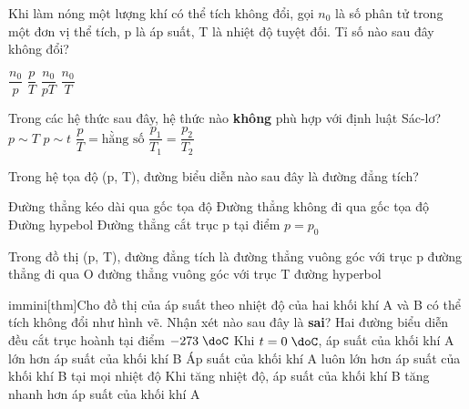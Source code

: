 \begin{ex} %
	Khi làm nóng một lượng khí có thể tích không đổi, gọi $n_0$ là số phân tử trong một đơn vị thể tích, p là áp suất, T là nhiệt độ tuyệt đối. Tỉ số nào sau đây không đổi?
	
	\choice
	{$\dfrac{n_0}{p}$}
	{\True $\dfrac{p}{T}$}
	{$\dfrac{n_0}{pT}$}
	{$\dfrac{n_0}{T}$}
	
\end{ex}
\begin{ex}%
	Trong các hệ thức sau đây, hệ thức nào \textbf{không} phù hợp với định luật Sác-lơ?
	\choice
	{$p\sim T$}
	{\True $p\sim t$}
	{$\dfrac{p}{T} = \text{hằng số}$}
	{$\dfrac{p_1}{T_1} = \dfrac{p_2}{T_2}$}
\end{ex}
\begin{ex} %
	Trong hệ tọa độ (p, T), đường biểu diễn nào sau đây là đường đẳng tích?
	
	\choice
	{\True Đường thẳng kéo dài qua gốc tọa độ}
	{Đường thẳng không đi qua gốc tọa độ}
	{Đường hypebol}
	{Đường thẳng cắt trục p tại điểm $p = p_0$}
	
\end{ex}
\begin{ex} %
	Trong đồ thị (p, T), đường đẳng tích là
	\choice
	{đường thẳng vuông góc với trục p}
	{\True đường thẳng đi qua O}
	{đường thẳng vuông góc với trục T}
	{đường hyperbol}
	
\end{ex}
\begin{ex}%
	immini[thm]{Cho đồ thị của áp suất theo nhiệt độ của hai khối khí A và B
		có thể tích không đổi như hình vẽ. Nhận xét nào sau đây là \textbf{sai}?\choice
		{Hai đường biểu diễn đều cắt trục hoành tại điểm $-273\;\doC$}
		{Khi $t = 0\;\doC$, áp suất của khối khí A lớn hơn áp suất của khối khí B}
		{Áp suất của khối khí A luôn lớn hơn áp suất của khối khí B tại mọi nhiệt độ}
		{\True Khi tăng nhiệt độ, áp suất của khối khí B tăng nhanh hơn áp suất của khối khí A}}{}
	
	
\end{ex}
